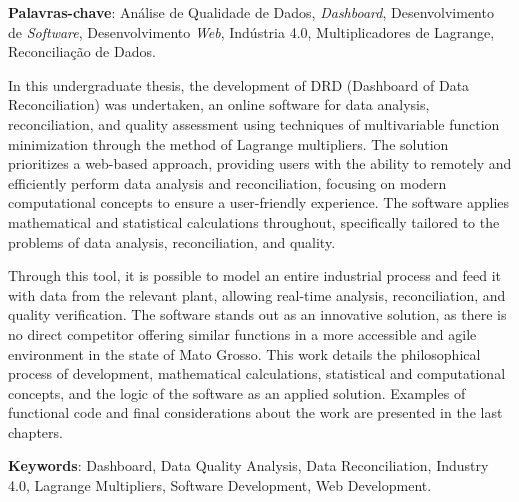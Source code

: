\vspace{1.5ex}

{\bf Palavras-chave}: Análise de Qualidade de Dados, \textit{Dashboard}, Desenvolvimento de \textit{Software}, Desenvolvimento \textit{Web}, Indústria 4.0, Multiplicadores de Lagrange, Reconciliação de Dados.

%
%

In this undergraduate thesis, the development of DRD (Dashboard of Data Reconciliation) was undertaken, an online software for data analysis, reconciliation, and quality assessment using techniques of multivariable function minimization through the method of Lagrange multipliers. The solution prioritizes a web-based approach, providing users with the ability to remotely and efficiently perform data analysis and reconciliation, focusing on modern computational concepts to ensure a user-friendly experience. The software applies mathematical and statistical calculations throughout, specifically tailored to the problems of data analysis, reconciliation, and quality.

Through this tool, it is possible to model an entire industrial process and feed it with data from the relevant plant, allowing real-time analysis, reconciliation, and quality verification. The software stands out as an innovative solution, as there is no direct competitor offering similar functions in a more accessible and agile environment in the state of Mato Grosso. This work details the philosophical process of development, mathematical calculations, statistical and computational concepts, and the logic of the software as an applied solution. Examples of functional code and final considerations about the work are presented in the last chapters.
\vspace{1.5ex}

{\bf Keywords}: Dashboard, Data Quality Analysis, Data Reconciliation, Industry 4.0, Lagrange Multipliers, Software Development, Web Development.
